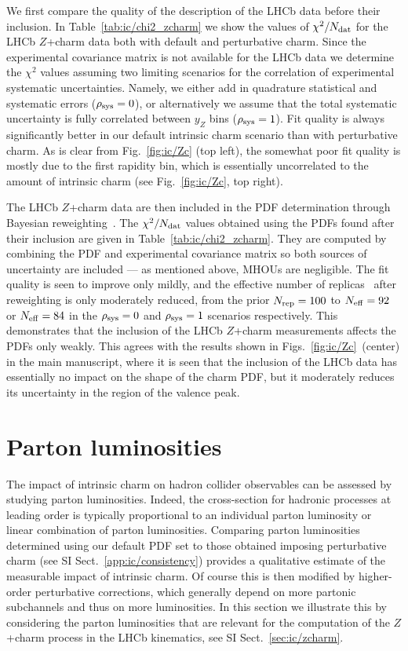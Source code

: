 We first compare the quality of the description of the LHCb data
before their inclusion. In Table~\ref{tab:ic/chi2_zcharm} we show the
values of $\chi^2/N_{\rm dat}$ for the LHCb $Z$+charm data
both with default and perturbative charm.
%
Since the experimental covariance matrix is not available for the LHCb
data we determine the $\chi^2$ values assuming two limiting scenarios
for the correlation of experimental systematic uncertainties.
%
Namely, 
we either add in quadrature statistical and systematic errors ($\rho_{\rm sys}=0$),
or alternatively we assume that the total systematic uncertainty
is fully correlated between $y_Z$ bins ($\rho_{\rm sys}=1$). Fit
quality is always significantly better in our default intrinsic charm
scenario than with perturbative charm.
%
As is clear from
Fig.~\ref{fig:ic/Zc} (top left), the somewhat poor fit quality is mostly due to the first
rapidity bin, which is essentially uncorrelated to the amount of
intrinsic charm (see
Fig.~\ref{fig:ic/Zc}, top right).

The LHCb $Z$+charm data are then included in the PDF determination
through
Bayesian reweighting~. The
$\chi^2/N_{\rm dat}$ values obtained using the PDFs found after their
inclusion are given in
Table~\ref{tab:ic/chi2_zcharm}.
%
They are computed by combining the PDF and
experimental covariance matrix so both sources of uncertainty are
included --- as mentioned above, MHOUs are negligible.
The fit quality is seen to improve only
mildly, and the effective number of
replicas~ after reweighting
is only moderately reduced, from the prior $N_{\rm rep}=100$ to $N_{\rm
eff}=92$ or $N_{\rm eff}=84$ in the
$\rho_{\rm sys}=0$ and $\rho_{\rm sys}=1$ scenarios respectively.
%
This
demonstrates that the inclusion of the LHCb $Z$+charm measurements  affects
the PDFs only weakly. This agrees with the results shown in 
Figs.~\ref{fig:ic/Zc}~(center) in
the main manuscript, where it is seen that the inclusion of the LHCb
data has essentially no impact on the shape of the charm PDF, but
it moderately reduces its uncertainty in the region of the valence peak.


\clearpage
\section{Parton luminosities}
\label{sec:ic/lumis}

The impact of intrinsic charm on hadron collider observables can be
assessed by studying  parton luminosities. Indeed, the
cross-section for hadronic processes at leading order is typically
proportional to an individual parton luminosity or linear combination
of parton luminosities.
%
Comparing parton luminosities determined
using our default PDF set to those obtained imposing perturbative
charm (see SI Sect.~\ref{app:ic/consistency}) provides a qualitative estimate of the
measurable impact of intrinsic charm. Of course this is then modified
by higher-order
perturbative corrections, which generally depend on more partonic
subchannels and thus on more luminosities.
%
In this section we illustrate this by considering the parton
luminosities that are relevant for the computation of the
$Z$+charm process in the LHCb kinematics, see SI Sect.~\ref{sec:ic/zcharm}.

